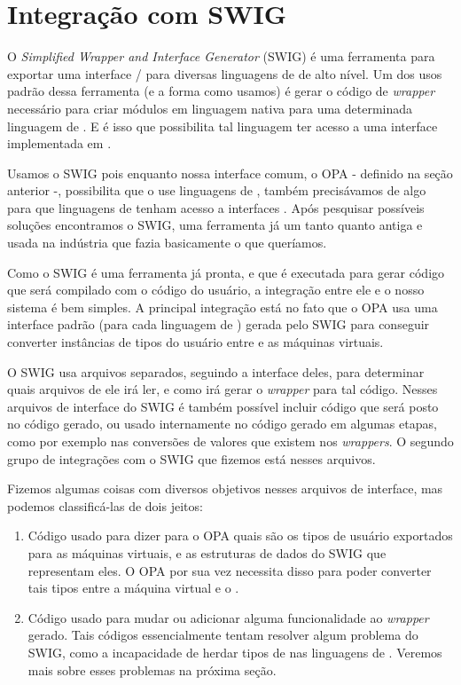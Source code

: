   \section{Integração com SWIG}
  O \emph{Simplified Wrapper and Interface Generator} (SWIG\footnotemark{}) é uma ferramenta
  para exportar uma interface \C{}/\CXX{} para diversas linguagens de \script{} de alto nível.
  Um dos usos padrão dessa ferramenta (e a forma como usamos) é gerar o código de \textit{wrapper}
  necessário para criar módulos em linguagem nativa para uma determinada linguagem de \script{}.
  E é isso que possibilita tal linguagem ter acesso a uma interface implementada em \CXX{}.
  
  
  Usamos o SWIG pois enquanto nossa interface comum, o OPA - definido na seção anterior -, 
  possibilita que o \CXX{} use linguagens de \script{}, também precisávamos de algo para que linguagens 
  de \script{} tenham acesso a interfaces \CXX{}. Após pesquisar possíveis soluções encontramos
  o SWIG, uma ferramenta já um tanto quanto antiga e usada na indústria que fazia basicamente o
  que queríamos.
  
  Como o SWIG é uma ferramenta já pronta, e que é executada para gerar código que será compilado
  com o código do usuário, a integração entre ele e o nosso sistema é bem simples. A principal
  integração está no fato que o OPA usa uma interface padrão (para cada linguagem de \script{})
  gerada pelo SWIG para conseguir converter instâncias de tipos do usuário entre \CXX{} e as
  máquinas virtuais.
  
  O SWIG usa arquivos separados, seguindo a interface deles, para determinar quais arquivos
  de \CXX{} ele irá ler, e como irá gerar o \textit{wrapper} para tal código. Nesses arquivos
  de interface do SWIG é também possível incluir código que será posto no código gerado, ou usado
  internamente no código gerado em algumas etapas, como por exemplo nas conversões de valores
  que existem nos \textit{wrappers}. O segundo grupo de integrações com o SWIG que fizemos está
  nesses arquivos.
  
  Fizemos algumas coisas com diversos objetivos nesses arquivos de interface, mas podemos
  classificá-las de dois jeitos:
  \begin{enumerate}
    \item Código usado para dizer para o OPA quais são os tipos de usuário exportados para
      as máquinas virtuais, e as estruturas de dados do SWIG que representam eles. O OPA
      por sua vez necessita disso para poder converter tais tipos entre a máquina virtual
      e o \CXX{}.
    \item Código usado para mudar ou adicionar alguma funcionalidade ao \textit{wrapper}
      gerado. Tais códigos essencialmente tentam resolver algum problema do SWIG, como
      a incapacidade de herdar tipos de \CXX{} nas linguagens de \script{}. Veremos mais
      sobre esses problemas na próxima seção.
  \end{enumerate}
  
